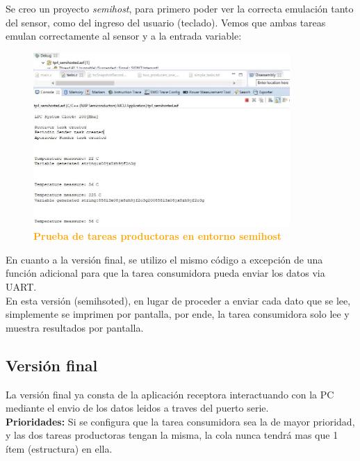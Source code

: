 \documentclass{article}
\begin{document}
Se creo un proyecto \textit{semihost}, para primero poder ver la correcta emulación tanto del sensor, como del ingreso del usuario (teclado). Vemos que ambas
tareas emulan correctamente al sensor y a la entrada variable:\\
\begin{figure}[H]
   \centering
   \includegraphics[width=0.87\textwidth]{figures/semihost.jpg}
   \centering
   \caption{\textbf{\textcolor{Orange}{Prueba de tareas productoras en entorno semihost}}}
\end{figure}

En cuanto a la versión final, se utilizo el mismo código a excepción de una función adicional para que la tarea consumidora pueda enviar los datos via UART. \\

En esta versión (semihsoted), en lugar de proceder a enviar cada dato que se lee, simplemente se imprimen por pantalla, por ende, la tarea consumidora solo lee y muestra resultados por pantalla.\\

\subsection{Versión final}

La versión final ya consta de la aplicación receptora interactuando con la PC mediante el envio de los datos leidos a traves del puerto serie. \\

\textbf{Prioridades:}
Si se configura que la tarea consumidora sea la de mayor prioridad, y las dos tareas productoras tengan la misma, la cola nunca tendrá mas que 1 ítem (estructura) en ella. \\
\end{document}
